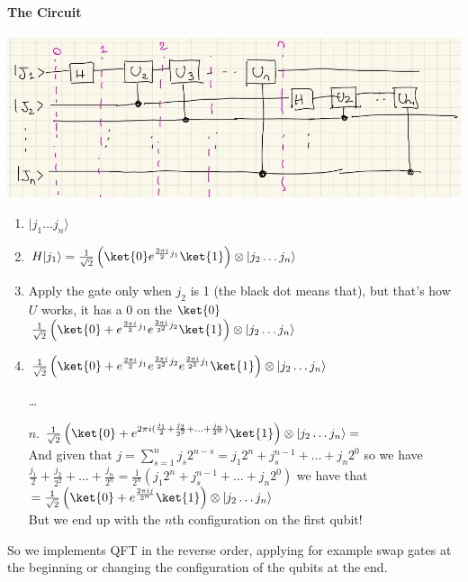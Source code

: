 \documentclass[10pt]{report}
\begin{document}
\paragraph{The Circuit}
\begin{center}
	\includegraphics[scale=0.5]{25.png}
\end{center}
\begin{enumerate}
	\item $|j_1\ldots j_n\rangle$
	\item $H|j_1\rangle = \frac{1}{\sqrt{2}}\left(\ket{0} e^{\frac{2\pi i}{2}j_1}\ket{1}\right)\otimes |j_2\ldots j_n\rangle$
	\item Apply the gate only when $j_2$ is 1 (the black dot means that), but that's how $U$ works, it has a 0 on the $\ket{0}$\\
	$\frac{1}{\sqrt{2}}\left(\ket{0}+e^{\frac{2\pi i}{2}j_1}e^{\frac{2\pi i}{2^2}j_2}\ket{1}\right)\otimes|j_2\ldots j_n\rangle$
	\item $\frac{1}{\sqrt{2}}\left(\ket{0}+e^{\frac{2\pi i}{2}j_1}e^{\frac{2\pi i}{2^2}j_2}e^{\frac{2\pi i}{2^3}j_1}\ket{1}\right)\otimes|j_2\ldots j_n\rangle$
	\item[] \ldots
	\item[$n$.] $\frac{1}{\sqrt{2}}\left(\ket{0}+e^{2\pi i(\frac{j_1}{2}+\frac{j_2}{2^2}+\ldots+\frac{j_n}{2^n})}\ket{1}\right)\otimes|j_2\ldots j_n\rangle=$\\
	And given that 
	$j = \sum_{s=1}^nj_s 2^{n-s} = j_1 2^n+j_s^{n-1}+\ldots +j_n 2^0$ so we have
	$\frac{j_1}{2}+\frac{j_2}{2^2}+\ldots+\frac{j_n}{2^n} = \frac{1}{2^n}(j_1 2^n+j_s^{n-1}+\ldots +j_n 2^0)$ we have that\\
	$=\frac{1}{\sqrt{2}}\left(\ket{0} + e^{\frac{2\pi ij}{2^n}}\ket{1}\right)\otimes |j_2\ldots j_n\rangle$\\
	But we end up with the $n$th configuration on the first qubit!
\end{enumerate}
So we implements QFT in the reverse order, applying for example swap gates at the beginning or changing the configuration of the qubits at the end.
\end{document}
